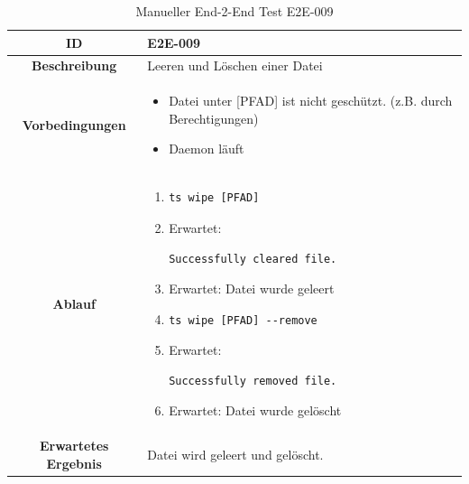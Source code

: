 \documentclass[a4paper,12pt]{report}
\begin{document}
    \begin{table}[h!]
        \centering
        \setlength{\leftmargini}{0.8cm}
        \begin{tabular}{|c|p{10cm}|}
            \hline
            \textbf{ID}                  & E2E-009                          \\ \hline
            \textbf{Beschreibung}        & Leeren und Löschen einer Datei   \\ \hline
            \textbf{Vorbedingungen} &
            \begin{itemize}
                \item Datei unter [PFAD] ist nicht geschützt. (z.B. durch Berechtigungen)
                \item Daemon läuft
            \end{itemize} \\ \hline
            \textbf{Ablauf} &
            \begin{enumerate}
                \item \begin{verbatim}ts wipe [PFAD]
                \end{verbatim}
                \item Erwartet: \begin{verbatim}Successfully cleared file.
                \end{verbatim}
                \item Erwartet: Datei wurde geleert
                \item \begin{verbatim}ts wipe [PFAD] --remove
                \end{verbatim}
                \item Erwartet: \begin{verbatim}Successfully removed file.
                \end{verbatim}
                \item Erwartet: Datei wurde gelöscht
            \end{enumerate} \\ \hline
            \textbf{Erwartetes Ergebnis} & Datei wird geleert und gelöscht. \\ \hline
        \end{tabular}
        \caption{Manueller End-2-End Test E2E-009}\label{tab:e2e-9}
    \end{table}

    \clearpage
\end{document}
